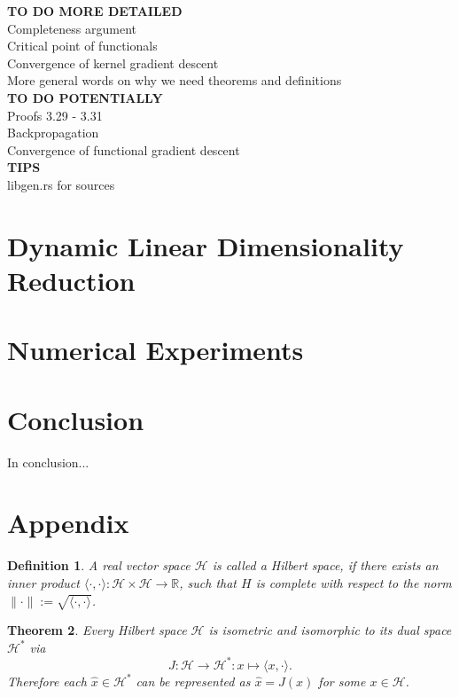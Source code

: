 \documentclass[11pt, a4paper]{article}
\newtheorem{theorem}{Theorem}[section]
\newtheorem{definition}[theorem]{Definition}
\newcommand{\R}{\mathds{R}}
\renewcommand{\H}{\mathcal{H}}
\begin{document}
\textbf{TO DO MORE DETAILED} \\
Completeness argument \\
Critical point of functionals \\
Convergence of kernel gradient descent \\
More general words on why we need theorems and definitions \\

\textbf{TO DO POTENTIALLY} \\
Proofs 3.29 - 3.31 \\
Backpropagation \\
Convergence of functional gradient descent \\

\textbf{TIPS} \\
libgen.rs for sources \\

\pagebreak
\section{Dynamic Linear Dimensionality Reduction}

\pagebreak
\section{Numerical Experiments}

\pagebreak
\section{Conclusion}

In conclusion...

\pagebreak
\section{Appendix}

\begin{definition}
A real vector space $\H$ is called a Hilbert space, if there exists an inner product $\langle \cdot,\cdot \rangle : \H \times \H \to \R$, such that $H$ is complete with respect to the norm $\| \cdot \| := \sqrt{\langle \cdot,\cdot \rangle}$.
\end{definition}

\begin{theorem}
Every Hilbert space $\H$ is isometric and isomorphic to its dual space $\H^*$ via
\[ J: \H \to \H^* : x \mapsto \langle x, \cdot \rangle. \]
Therefore each $\hat{x} \in \H^*$ can be represented as $\hat{x} = J(x)$ for some $x \in \H$.
\end{theorem}
\end{document}
